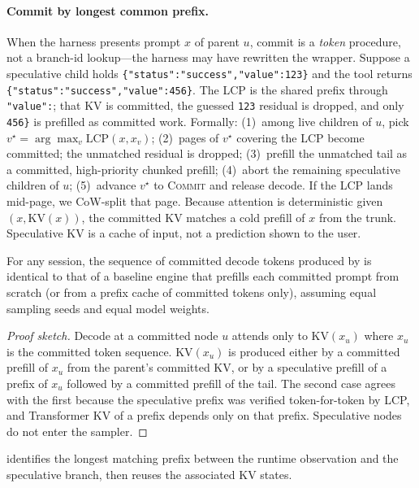 \paragraph{Commit by longest common prefix.}
When the harness presents prompt $x$ of parent $u$, commit is a \emph{token} procedure, not a branch-id lookup---the harness may have rewritten the wrapper.
Suppose a speculative child holds
\texttt{\{"status":"success","value":123\}}
and the tool returns
\texttt{\{"status":"success","value":456\}}.
The LCP is the shared prefix through \texttt{"value":}; that KV is committed, the guessed \texttt{123} residual is dropped, and only \texttt{456\}} is prefilled as committed work.
Formally:
(1)~among live children of $u$, pick $v^\star = \arg\max_v \mathrm{LCP}(x, x_v)$;
(2)~pages of $v^\star$ covering the LCP become committed; the unmatched residual is dropped;
(3)~prefill the unmatched tail as a committed, high-priority chunked prefill;
(4)~abort the remaining speculative children of $u$;
(5)~advance $v^\star$ to \textsc{Commit} and release decode.
If the LCP lands mid-page, we CoW-split that page.
Because attention is deterministic given $(x, \mathrm{KV}(x))$, the committed KV matches a cold prefill of $x$ from the trunk.
Speculative KV is a cache of input, not a prediction shown to the user.

\begin{theorem}
\label{thm:correct}
For any session, the sequence of committed decode tokens produced by \sys is identical to that of a baseline engine that prefills each committed prompt from scratch (or from a prefix cache of committed tokens only), assuming equal sampling seeds and equal model weights.
\end{theorem}
\begin{proof}[Proof sketch]
Decode at a committed node $u$ attends only to $\mathrm{KV}(x_u)$ where $x_u$ is the committed token sequence.
$\mathrm{KV}(x_u)$ is produced either by a committed prefill of $x_u$ from the parent's committed KV, or by a speculative prefill of a prefix of $x_u$ followed by a committed prefill of the tail.
The second case agrees with the first because the speculative prefix was verified token-for-token by LCP, and Transformer KV of a prefix depends only on that prefix.
Speculative nodes do not enter the sampler.
\end{proof}

\sys identifies the longest matching prefix between the runtime observation and the speculative branch, then reuses the associated KV states.

